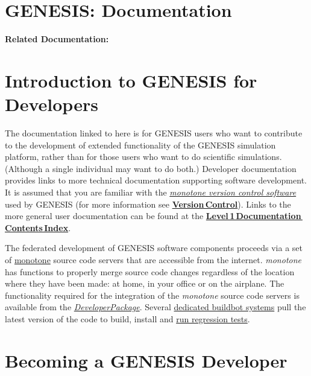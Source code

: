 \documentclass[12pt]{article}
\begin{document}
\section*{GENESIS: Documentation}

{\bf Related Documentation:}

\section*{Introduction to GENESIS for Developers}

The documentation linked to here is for GENESIS users who want to
contribute to the development of extended functionality of the GENESIS
simulation platform, rather than for those users who want to do
scientific simulations. (Although a single individual may want to do
both.) Developer documentation provides links to more technical
documentation supporting software development. It is assumed that you
are familiar with the \href{http://monotone.ca/}{\it monotone version
  control software} used by GENESIS (for more information see
\href{../version-control/version-control.tex}{\bf Version\,Control}).
Links to the more general user documentation can be found at the
\href{http://www.genesis-sim.org/userdocs/contents-level1/contents-level1.html}{\bf
  Level\,1\,Documentation\,Contents\,Index}.

The federated development of GENESIS software components proceeds via
a set of \href{http://monotone.ca/}{monotone} source code servers that
are accessible from the internet. {\it monotone} has functions to
properly merge source code changes regardless of the location where
they have been made: at home, in your office or on the airplane.  The
functionality required for the integration of the {\it monotone}
source code servers is available from the
\href{../developer-package/developer-package.tex}{\it
  DeveloperPackage}.  Several
\href{../genesis-system/genesis-system.tex}{dedicated buildbot
  systems} pull the latest version of the code to build, install and
\href{../neurospaces-tester/neurospaces-tester.tex}{run regression
  tests}.

\section*{Becoming a GENESIS Developer}
\end{document}
